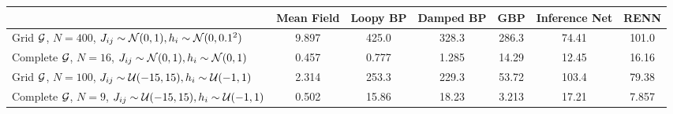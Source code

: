 \begin{frame}
\begin{table}
    \vskip -0.1in
    \centering
    \begin{adjustbox}{width=0.98\textwidth}
      \begin{tabular}{lcccccc}
        \toprule
        {} &  Mean Field & Loopy BP & Damped BP & GBP & Inference Net & RENN \\
        \toprule
        Grid $\mathcal{G}$, $N=400$, $J_{ij}\sim \mathcal{N}(0,1), h_i\sim\mathcal{N}(0,0.1^2)$ & 9.897 & 425.0 & 328.3 & 286.3 & 74.41 & 101.0 \\
        Complete $\mathcal{G}$, $N=16$, $J_{ij}\sim \mathcal{N}(0,1), h_i\sim\mathcal{N}(0,1)$ & 0.457 & 0.777 & 1.285 & 14.29 &  12.45  & 16.16\\
        Grid $\mathcal{G}$, $N=100$, $J_{ij}\sim \mathcal{U}(-15,15), h_i\sim\mathcal{U}(-1,1)$ & 2.314 & 253.3 & 229.3 & 53.72 & 103.4 & 79.38 \\
        Complete $\mathcal{G}$, $N=9$, $J_{ij}\sim \mathcal{U}(-15,15), h_i\sim\mathcal{U}(-1,1)$ & 0.502 & 15.86 & 18.23 & 3.213 & 17.21 & 7.857 \\
        \bottomrule
      \end{tabular}
    \end{adjustbox}
  \end{table}
\end{frame}
